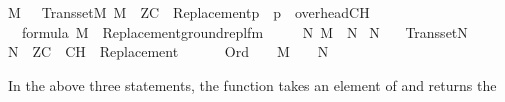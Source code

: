 \begin{isabelle}%
{\isasymlbrakk}M\ {\isasymapprox}\ {\isasymomega}{\isacharsemicolon}{\kern0pt}\ Transset{\isacharparenleft}{\kern0pt}M{\isacharparenright}{\kern0pt}{\isacharsemicolon}{\kern0pt}\ M\ {\isasymTurnstile}\ ZC\ {\isasymunion}\ {\isacharbraceleft}{\kern0pt}{\isasymcdot}Replacement{\isacharparenleft}{\kern0pt}p{\isacharparenright}{\kern0pt}{\isasymcdot}\ {\isachardot}{\kern0pt}\ p\ {\isasymin}\ overhead{\isacharunderscore}{\kern0pt}CH{\isacharbraceright}{\kern0pt}{\isacharsemicolon}{\kern0pt}\isanewline
\isaindent{\ }{\isasymPhi}\ {\isasymsubseteq}\ formula{\isacharsemicolon}{\kern0pt}\ M\ {\isasymTurnstile}\ {\isacharbraceleft}{\kern0pt}{\isasymcdot}Replacement{\isacharparenleft}{\kern0pt}ground{\isacharunderscore}{\kern0pt}repl{\isacharunderscore}{\kern0pt}fm{\isacharparenleft}{\kern0pt}{\isasymphi}{\isacharparenright}{\kern0pt}{\isacharparenright}{\kern0pt}{\isasymcdot}\ {\isachardot}{\kern0pt}\ {\isasymphi}\ {\isasymin}\ {\isasymPhi}{\isacharbraceright}{\kern0pt}{\isasymrbrakk}\isanewline
{\isasymLongrightarrow}\ {\isasymexists}N{\isachardot}{\kern0pt}\ M\ {\isasymsubseteq}\ N\ {\isasymand}\isanewline
{}N\ {\isasymapprox}\ {\isasymomega}\ {\isasymand}\isanewline
{}Transset{\isacharparenleft}{\kern0pt}N{\isacharparenright}{\kern0pt}\ {\isasymand}\isanewline
{}N\ {\isasymTurnstile}\ ZC\ {\isasymunion}\ {\isacharbraceleft}{\kern0pt}{\isasymcdot}CH{\isasymcdot}{\isacharbraceright}{\kern0pt}\ {\isasymunion}\ {\isacharbraceleft}{\kern0pt}{\isasymcdot}Replacement{\isacharparenleft}{\kern0pt}{\isasymphi}{\isacharparenright}{\kern0pt}{\isasymcdot}\ {\isachardot}{\kern0pt}\ {\isasymphi}\ {\isasymin}\ {\isasymPhi}{\isacharbraceright}{\kern0pt}\ {\isasymand}\isanewline
{}\ Ord{\isacharparenleft}{\kern0pt}{\isasymalpha}{\isacharparenright}{\kern0pt}\ {\isasymlongrightarrow}\ {\isasymalpha}\ {\isasymin}\ M\ {\isasymlongleftrightarrow}\ {\isasymalpha}\ {\isasymin}\ N{\isacharparenright}{\kern0pt}%
\end{isabelle}%
In the above three statements, the function 
takes an element \isa{{\isasymphi}} of  and returns the
